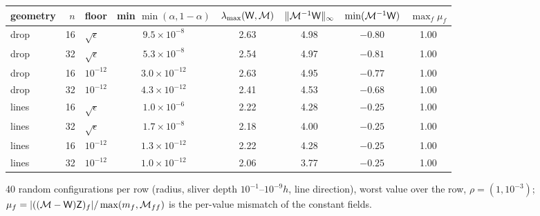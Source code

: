 \begin{center}\footnotesize
\setlength\tabcolsep{4pt}
\begin{tabular}{@{}lrlccccc@{}}
\toprule
geometry & $n$ & floor & min $\min(\alpha,1-\alpha)$ & $\lambda_{\max}(\mathsf W,\mathcal M)$ &
$\|\mathcal M^{-1}\mathsf W\|_\infty$ & $\min(\mathcal M^{-1}\mathsf W)$ & $\max_f\mu_f$\\
\midrule
drop & 16 & $\sqrt{\epsilon}$ & $9.5\times10^{-8}$ & 2.63 & 4.98 & $-0.80$ & 1.00\\
drop & 32 & $\sqrt{\epsilon}$ & $5.3\times10^{-8}$ & 2.54 & 4.97 & $-0.81$ & 1.00\\
drop & 16 & $10^{-12}$ & $3.0\times10^{-12}$ & 2.63 & 4.95 & $-0.77$ & 1.00\\
drop & 32 & $10^{-12}$ & $4.3\times10^{-12}$ & 2.41 & 4.53 & $-0.68$ & 1.00\\
lines & 16 & $\sqrt{\epsilon}$ & $1.0\times10^{-6}$ & 2.22 & 4.28 & $-0.25$ & 1.00\\
lines & 32 & $\sqrt{\epsilon}$ & $1.7\times10^{-8}$ & 2.18 & 4.00 & $-0.25$ & 1.00\\
lines & 16 & $10^{-12}$ & $1.3\times10^{-12}$ & 2.22 & 4.28 & $-0.25$ & 1.00\\
lines & 32 & $10^{-12}$ & $1.0\times10^{-12}$ & 2.06 & 3.77 & $-0.25$ & 1.00\\
\bottomrule
\end{tabular}
\end{center}
40 random configurations per row (radius, sliver depth $10^{-1}$--$10^{-9}h$, line
direction), worst value over the row, $\rho=(1,10^{-3})$;
$\mu_f=|((\mathcal M-\mathsf W)\mathsf Z)_f|/\max(m_f,\mathcal M_{ff})$ is the per-value mismatch of the constant fields.

